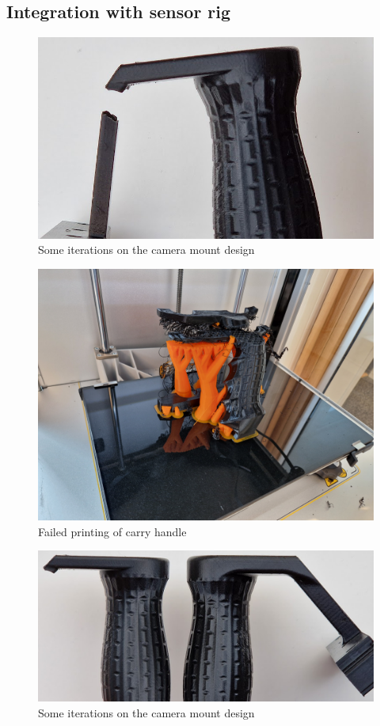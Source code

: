 \subsection{Integration with sensor rig}

\begin{figure}[H]
    \centering
    \includegraphics[width=\textwidth]{figures/3d_print/break.png}
    \caption{Some iterations on the camera mount design}
    \label{fig:handle_break}
\end{figure}

\begin{figure}[H]
    \centering
    \includegraphics[width=\textwidth]{figures/3d_print/failed.jpg}
    \caption{Failed printing of carry handle}
    \label{fig:handle_fail}
\end{figure}

\begin{figure}[H]
    \centering
    \includegraphics[width=\textwidth]{figures/3d_print/thickness.png}
    \caption{Some iterations on the camera mount design}
    \label{fig:handle_thickness}
\end{figure}
